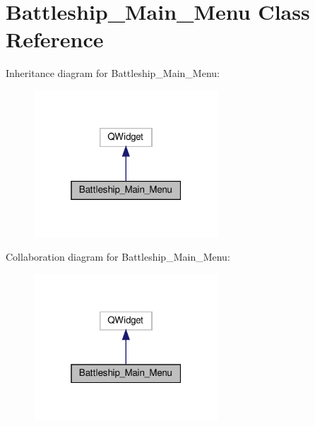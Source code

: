 \hypertarget{classBattleship__Main__Menu}{}\section{Battleship\+\_\+\+Main\+\_\+\+Menu Class Reference}
\label{classBattleship__Main__Menu}


Inheritance diagram for Battleship\+\_\+\+Main\+\_\+\+Menu\+:\nopagebreak
\begin{figure}[H]
\begin{center}
\leavevmode
\includegraphics[width=196pt]{classBattleship__Main__Menu__inherit__graph}
\end{center}
\end{figure}


Collaboration diagram for Battleship\+\_\+\+Main\+\_\+\+Menu\+:\nopagebreak
\begin{figure}[H]
\begin{center}
\leavevmode
\includegraphics[width=196pt]{classBattleship__Main__Menu__coll__graph}
\end{center}
\end{figure}
